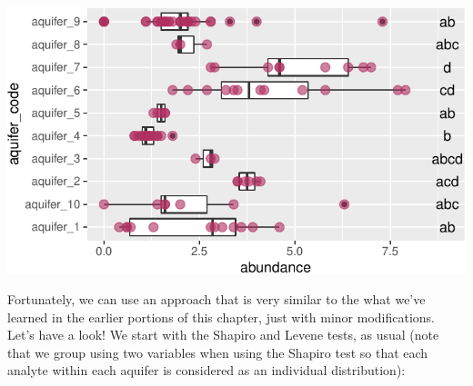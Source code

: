 \documentclass[
]{krantz}
\begin{document}
\begin{center}\includegraphics{index_files/figure-latex/unnamed-chunk-152-1} \end{center}

Fortunately, we can use an approach that is very similar to the what we've learned in the earlier portions of this chapter, just with minor modifications. Let's have a look! We start with the Shapiro and Levene tests, as usual (note that we group using two variables when using the Shapiro test so that each analyte within each aquifer is considered as an individual distribution):
\end{document}
